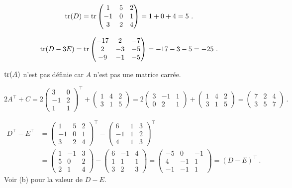 {
\[
\operatorname{tr}(D) =
\operatorname{tr} \begin{pmatrix} 1 & 5 & 2 \\ -1 & 0 & 1 \\ 3 & 2 & 4 \end{pmatrix}
= 1 + 0 + 4 = 5 \ .
\]

\[
\operatorname{tr}(D-3E) = \operatorname{tr}
\begin{pmatrix} -17 & 2 & -7 \\ 2 & -3 & -5 \\ -9 & -1 & -5 \end{pmatrix}
= -17 -3 -5 = -25 \ .
\]

$\operatorname{tr}(A)$ n'est pas définie car $A$ n'est pas une matrice carrée.

\[
2A^\top+C
= 2 \begin{pmatrix} 3 & 0 \\ -1 & 2 \\ 1 & 1 \end{pmatrix}^\top
+\begin{pmatrix} 1 & 4 & 2 \\ 3 & 1 & 5 \end{pmatrix}
= 2 \begin{pmatrix} 3 & -1 & 1 \\ 0 & 2 & 1 \end{pmatrix}
+ \begin{pmatrix} 1 & 4 & 2 \\ 3 & 1 & 5 \end{pmatrix}
= \begin{pmatrix} 7 & 2 & 4 \\ 3 & 5 & 7 \end{pmatrix}
\ .
\]

\begin{align*}
D^\top - E^\top &=
\begin{pmatrix} 1 & 5 & 2 \\ -1 & 0 & 1 \\ 3 & 2 & 4 \end{pmatrix}^\top
- \begin{pmatrix} 6 & 1 & 3 \\ -1 & 1 & 2 \\ 4 & 1 & 3 \end{pmatrix}^\top \\
& = \begin{pmatrix} 1 & -1 & 3 \\ 5 & 0 & 2 \\ 2 & 1 & 4 \end{pmatrix}
- \begin{pmatrix} 6 & -1 & 4 \\ 1 & 1 & 1 \\ 3 & 2 & 3 \end{pmatrix}
= \begin{pmatrix} -5 & 0 & -1 \\ 4 & -1 & 1 \\ -1 & -1 & 1 \end{pmatrix}
= ( D-E)^\top \ .
\end{align*}
Voir (b) pour la valeur de $D-E$.

}
